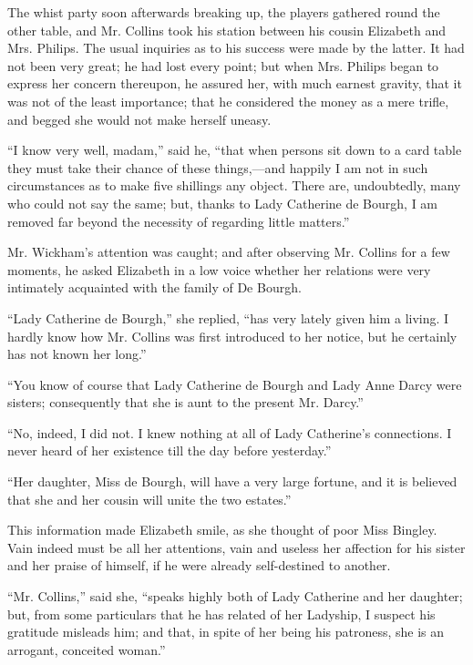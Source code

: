 \documentclass[10pt]{book}
\begin{document}
   The whist party soon afterwards breaking up, the players gathered round
the other table, and Mr. Collins took his station between his cousin
Elizabeth and Mrs. Philips. The usual inquiries as to his success were
made by the latter. It had not been very great; he had lost every point;
but when Mrs. Philips began to express her concern thereupon, he assured
her, with much earnest gravity, that it was not of the least importance;
that he
   considered the money as a mere trifle, and begged she would not
make herself uneasy.
  

   “I know very well, madam,” said he, “that when persons sit down to a
card table they must take their chance of these things,—and happily I
am not in such circumstances as to make five shillings any object. There
are, undoubtedly, many who could not say the same; but, thanks to Lady
Catherine de Bourgh, I am removed far beyond the necessity of regarding
little matters.”
  

   Mr. Wickham’s attention was caught; and after observing Mr. Collins for
a few moments, he asked Elizabeth in a low voice whether her relations
were very intimately acquainted with the family of De Bourgh.
  

   “Lady Catherine de Bourgh,” she replied, “has very lately given him a
living. I hardly know how Mr. Collins was first introduced to her
notice, but he certainly has not known her long.”
  

   “You know of course that Lady Catherine de Bourgh and Lady Anne Darcy
were sisters; consequently that she is aunt to the present Mr. Darcy.”
  

   “No, indeed, I did not. I knew nothing at all of Lady Catherine’s
connections. I never heard of her existence till the day before
yesterday.”
  

   “Her daughter, Miss de Bourgh, will have a very large fortune, and it is
believed that she and her cousin will unite the two estates.”
  

   This information made Elizabeth smile, as she thought of poor Miss
Bingley. Vain indeed must be all her attentions, vain and useless her
affection for his sister and her praise of himself, if he were already
self-destined to another.
  

   “Mr. Collins,” said she, “speaks highly both of Lady Catherine and her
daughter; but, from some particulars
   that he has related of her
Ladyship, I suspect his gratitude misleads him; and that, in spite of
her being his patroness, she is an arrogant, conceited woman.”
  
\end{document}
